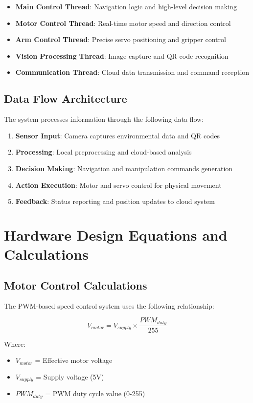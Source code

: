 \begin{itemize}
\item \textbf{Main Control Thread}: Navigation logic and high-level decision making
\item \textbf{Motor Control Thread}: Real-time motor speed and direction control
\item \textbf{Arm Control Thread}: Precise servo positioning and gripper control
\item \textbf{Vision Processing Thread}: Image capture and QR code recognition
\item \textbf{Communication Thread}: Cloud data transmission and command reception
\end{itemize}

\subsection{Data Flow Architecture}
The system processes information through the following data flow:

\begin{enumerate}
\item \textbf{Sensor Input}: Camera captures environmental data and QR codes
\item \textbf{Processing}: Local preprocessing and cloud-based analysis
\item \textbf{Decision Making}: Navigation and manipulation commands generation
\item \textbf{Action Execution}: Motor and servo control for physical movement
\item \textbf{Feedback}: Status reporting and position updates to cloud system
\end{enumerate}

\section{Hardware Design Equations and Calculations}

\subsection{Motor Control Calculations}
The PWM-based speed control system uses the following relationship:

\begin{equation}
V_{motor} = V_{supply} \times \frac{PWM_{duty}}{255}
\end{equation}

Where:
\begin{itemize}
\item $V_{motor}$ = Effective motor voltage
\item $V_{supply}$ = Supply voltage (5V)
\item $PWM_{duty}$ = PWM duty cycle value (0-255)
\end{itemize}

